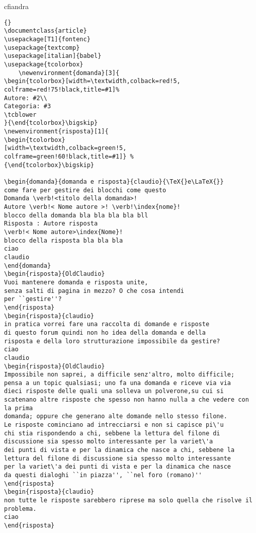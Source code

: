 \begin{risposta}{cfiandra}
	\begin{lstlisting}{}
\documentclass{article}
\usepackage[T1]{fontenc}
\usepackage{textcomp}
\usepackage[italian]{babel}
\usepackage{tcolorbox}
	\newenvironment{domanda}[3]{
\begin{tcolorbox}[width=\textwidth,colback=red!5,
colframe=red!75!black,title=#1]%
Autore: #2\\
Categoria: #3
\tcblower
}{\end{tcolorbox}\bigskip}
\newenvironment{risposta}[1]{
\begin{tcolorbox}
[width=\textwidth,colback=green!5,
colframe=green!60!black,title=#1]} %
{\end{tcolorbox}\bigskip} 

\begin{domanda}{domanda e risposta}{claudio}{\TeX{}e\LaTeX{}}
come fare per gestire dei blocchi come questo
Domanda \verb!<titolo della domanda>! 
Autore \verb!< Nome autore >! \verb!\index{nome}!
blocco della domanda bla bla bla bla bll
Risposta : Autore risposta 
\verb!< Nome autore>\index{Nome}!
blocco della risposta bla bla bla
ciao
claudio
\end{domanda}
\begin{risposta}{OldClaudio}
Vuoi mantenere domanda e risposta unite, 
senza salti di pagina in mezzo? O che cosa intendi 
per ``gestire''?
\end{risposta}
\begin{risposta}{claudio}
in pratica vorrei fare una raccolta di domande e risposte 
di questo forum quindi non ho idea della domanda e della 
risposta e della loro strutturazione impossibile da gestire?
ciao
claudio
\begin{risposta}{OldClaudio}
Impossibile non saprei, a difficile senz'altro, molto difficile; 
pensa a un topic qualsiasi; uno fa una domanda e riceve via via 
dieci risposte delle quali una solleva un polverone,su cui si 
scatenano altre risposte che spesso non hanno nulla a che vedere con la prima
domanda; oppure che generano alte domande nello stesso filone. 
Le risposte cominciano ad intrecciarsi e non si capisce pi\'u 
chi stia rispondendo a chi, sebbene la lettura del filone di 
discussione sia spesso molto interessante per la variet\'a  
dei punti di vista e per la dinamica che nasce a chi, sebbene la 
lettura del filone di discussione sia spesso molto interessante 
per la variet\'a dei punti di vista e per la dinamica che nasce	
da questi dialoghi ``in piazza'', ``nel foro (romano)''
\end{risposta}
\begin{risposta}{claudio}
non tutte le risposte sarebbero riprese ma solo quella che risolve il problema.
ciao 
\end{risposta}

\end{lstlisting}

\end{risposta}
